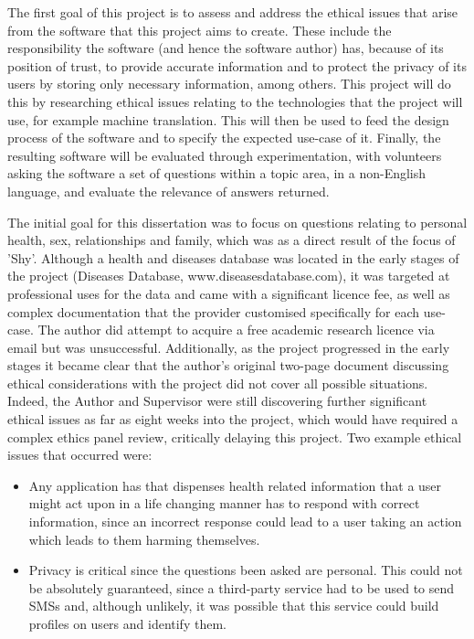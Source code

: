 \documentclass{article}
\begin{document}
The first goal of this project is to assess and address the ethical issues that arise from the software that this project aims to create.  These include the responsibility the software (and hence the software author) has, because of its position of trust, to provide accurate information and to protect the privacy of its users by storing only necessary information, among others.  This project will do this by researching ethical issues relating to the technologies that the project will use, for example machine translation.  This will then be used to feed the design process of the software and to specify the expected use-case of it.  Finally, the resulting software will be evaluated through experimentation, with volunteers asking the software a set of questions within a topic area, in a non-English language, and evaluate the relevance of answers returned.

The initial goal for this dissertation was to focus on questions relating to personal health, sex, relationships and family, which was as a direct result of the focus of 'Shy'.  Although a health and diseases database was located in the early stages of the project (Diseases Database, www.diseasesdatabase.com), it was targeted at professional uses for the data and came with a significant licence fee, as well as complex documentation that the provider customised specifically for each use-case.  The author did attempt to acquire a free academic research licence via email but was unsuccessful.  Additionally, as the project progressed in the early stages it became clear that the author's original two-page document discussing ethical considerations with the project did not cover all possible situations.  Indeed, the Author and Supervisor were still discovering further significant ethical issues as far as eight weeks into the project, which would have required a complex ethics panel review, critically delaying this project.  Two example ethical issues that occurred were:

\begin{itemize}
  \item Any application has that dispenses health related information that a user might act upon in a life changing manner has to respond with correct information, since an incorrect response could lead to a user taking an action which leads to them harming themselves.
  \item Privacy is critical since the questions been asked are personal.  This could not be absolutely guaranteed, since a third-party service had to be used to send SMSs and, although unlikely, it was possible that this service could build profiles on users and identify them.
\end{itemize}
\end{document}

